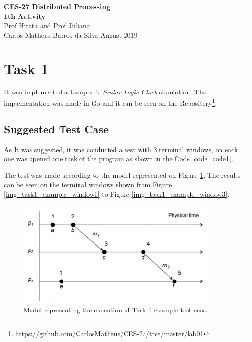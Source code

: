 \documentclass[a4paper, 11pt]{article}
\begin{document}
\noindent
\large\textbf{CES-27 Distributed Processing} \\
\textbf{1th Activity} \\
\normalsize Prof Hirata and Prof Juliana  \\
Carlos Matheus Barros da Silva \hfill August 2019

\section*{Task 1}

It was implemented a Lamport's \textit{Scalar Logic Clock} simulation. The implementation was made in Go and it can be seen on the Repository\footnote{https://github.com/CarlosMatheus/CES-27/tree/master/lab01}.

\subsection*{Suggested Test Case}

As It was suggested, it was conducted a test with 3 terminal windows, on each one was opened one task of the program as shown in the Code \ref{code_code1}.

The test was made according to the model represented on Figure \ref{img_task1}. The results can be seen on the terminal windows shown from Figure \ref{img_task1_example_window1} to Figure \ref{img_task1_example_window3}.

\begin{figure}[h]
  \begin{center}
  \includegraphics[width=4in]{./imgs/task1_example_model.jpeg}
  \caption{Model representing the execution of Task 1 example test case.}
  \label{img_task1}
  \end{center}
\end{figure}


\end{document}
